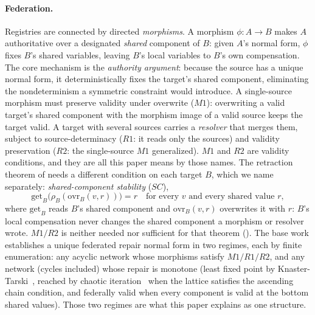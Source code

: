 \documentclass[11pt,a4paper]{article}
\theoremstyle{plain}
\theoremstyle{definition}
\theoremstyle{remark}
\renewcommand{\_}{\origunderscore\allowbreak}
\begin{document}
\paragraph{Federation.} Registries are connected by directed \emph{morphisms}. A morphism
$\phi : A \to B$ makes $A$ authoritative over a designated \emph{shared} component of $B$: given
$A$'s normal form, $\phi$ fixes $B$'s shared variables, leaving $B$'s local variables to $B$'s own
compensation. The core mechanism is the \emph{authority argument}: because the source has a unique
normal form, it deterministically fixes the target's shared component, eliminating the nondeterminism
a symmetric constraint would introduce. A single-source morphism must preserve validity under
overwrite ($M1$): overwriting a valid target's shared component with the morphism image of a valid
source keeps the target valid. A target with several sources carries a \emph{resolver} that merges
them, subject to source-determinacy ($R1$: it reads only the sources) and validity preservation
($R2$: the single-source $M1$ generalized). $M1$ and $R2$ are validity conditions, and they are all
this paper means by those names. The retraction theorem of  needs a different
condition on each target $B$, which we name separately: \emph{shared-component stability} ($SC$),
\[ \mathrm{get}_B\big(\rho_B(\mathrm{ovr}_B(v, r))\big) = r \quad \text{for every } v \text{ and every shared value } r, \]
where $\mathrm{get}_B$ reads $B$'s shared component and $\mathrm{ovr}_B(v, r)$ overwrites it with $r$:
$B$'s local compensation never changes the shared component a morphism or resolver wrote. $M1/R2$ is
neither needed nor sufficient for that theorem (). The base work establishes a unique
federated repair normal form in two regimes, each by finite enumeration: any acyclic network whose
morphisms satisfy $M1/R1/R2$, and any network (cycles included) whose repair is monotone (least fixed
point by Knaster-Tarski~\cite{tarski1955}, reached by chaotic iteration~\cite{cousot1977} when the
lattice satisfies the ascending chain condition, and federally valid when every component is valid
at the bottom shared values). Those two regimes are what this paper explains as one structure.
\end{document}
